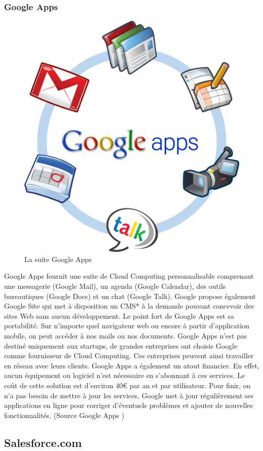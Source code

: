 \documentclass[a4paper,12pt]{report}
\begin{document}
\begin{onehalfspace}
	\subsubsection*{Google Apps}
		\begin{figure}
			\centering
			\includegraphics[height=0.47\textwidth]{ggapps.jpeg} 
			\caption{La suite Google Apps}
		\end{figure}
	Google Apps fournit une suite de Cloud Computing personnalisable comprenant une messagerie (Google Mail), un agenda (Google Calendar), des outils bureautiques (Google Docs) et un chat (Google Talk). Google propose également Google Site qui met à disposition un CMS* à la demande pouvant concevoir des sites Web sans aucun développement.\newline
Le point fort de Google Apps est sa portabilité. Sur n’importe quel navigateur web ou encore à partir d’application mobile, on peut accéder à nos mails ou nos documents. Google Apps n’est pas destiné uniquement aux startups, de grandes entreprises ont choisis Google comme fournisseur de Cloud Computing. Ces entreprises peuvent ainsi travailler en réseau avec leurs clients.\newline
Google Apps a également un atout financier. En effet, aucun équipement ou logiciel n’est nécessaire en s’abonnant à ces services. Le coût de cette solution est d’environ 40\euro{} par an et par utilisateur. Pour finir, on n’a pas besoin de mettre à jour les services, Google met à jour régulièrement ses applications en ligne pour corriger d'éventuels problèmes et ajouter de nouvelles fonctionnalités. (Source Google Apps \cite{source:ggapp})

	\subsection{Salesforce.com}


\end{onehalfspace}
\end{document}

